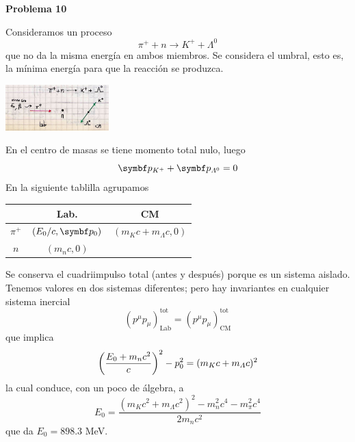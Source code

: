 \documentclass[10pt,oneside]{CBFT_book}
\begin{document}
\begin{ejemplo}{\bf Problema 10}

Consideramos un proceso
\[
	\pi^+ + n \longrightarrow K^+ + \Lambda^0
\]
que no da la misma energía en ambos miembros. Se considera el umbral, esto es, la mínima
energía para que la reacción se produzca.

\includegraphics[width=0.3\textwidth]{images/fig_ft1_sr_problema10.jpg}

En el centro de masas se tiene momento total nulo, luego
\[
	\vb{p}_{K^+} + \vb{p}_{\Lambda^0} = 0
\]
En la siguiente tablilla agrupamos

\begin{center}
\begin{tabular}{ccc}
 & Lab. & CM \\
\hline 
$\pi^+$ & $(E_0/c,\vb{p}_0)$ & $(m_K c + m_\Lambda c, 0)$ \\
$n$ & $(m_nc,0)$ &  \\
\hline
\end{tabular}
\end{center}

Se conserva el cuadriimpulso total (antes y después) porque es un sistema aislado.
Tenemos valores en dos sistemas diferentes; pero hay invariantes en cualquier
sistema inercial
\[
	(p^\mu p_\mu)_\text{Lab}^\text{tot} = (p^\mu p_\mu)_\text{CM}^\text{tot}
\]
que implica
\[
	\left( \frac{ E_0 + m_n c^2 }{ c } \right)^2 - p_0^2 = ( m_K c + m_\Lambda c )^2
\]
la cual conduce, con un poco de álgebra, a
\[
	E_0 = \frac{ ( m_K c^2 + m_\Lambda c^2 )^2 - m_n^2 c^4 - m_\pi^2 c^4 }{ 2 m_n c^2 }
\]
que da $E_0 = 898.3$ MeV.

\end{ejemplo}
\end{document}
